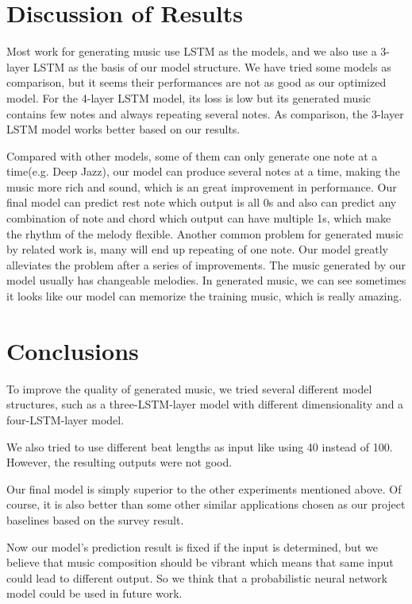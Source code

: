 \documentclass[conference]{IEEEtran}
\begin{document}
\section{Discussion of Results}
Most work for generating music use LSTM as the models,  and we also use a 3-layer LSTM as the basis of our model structure. We have tried some models as comparison, but it seems their performances are not as good as our optimized model. For the 4-layer LSTM model, its loss is low but its generated music contains few notes and always repeating several notes. As comparison, the 3-layer LSTM model works better based on our results.

Compared with other models, some of them can only generate one note at a time(e.g. Deep Jazz), our model can produce several notes at a time, making the music more rich and sound, which is an great improvement in performance. Our final model can predict rest note which output is all 0s and also can predict any combination of note and chord which output can have multiple 1s, which make the rhythm of the melody flexible. Another common problem for generated music by related work is, many will end up repeating of one note. Our model greatly alleviates the problem after a series of improvements. The music generated by our model usually has changeable melodies. In generated music, we can see sometimes it looks like our model can memorize the training music, which is really amazing. 

\section{Conclusions}
To improve the quality of generated music, we tried several different model structures, such as a three-LSTM-layer model with different dimensionality and a four-LSTM-layer model.

We also tried to use different beat lengths as input like using 40 instead of 100. However, the resulting outputs were not good.

Our final model is simply superior to the other experiments mentioned above. Of course, it is also better than some other similar applications chosen as our project baselines based on the survey result.

Now our model's prediction result is fixed if the input is determined, but we believe that music composition should be vibrant which means that same input could lead to different output. So we think that a probabilistic neural network model could be used in future work.
\end{document}
